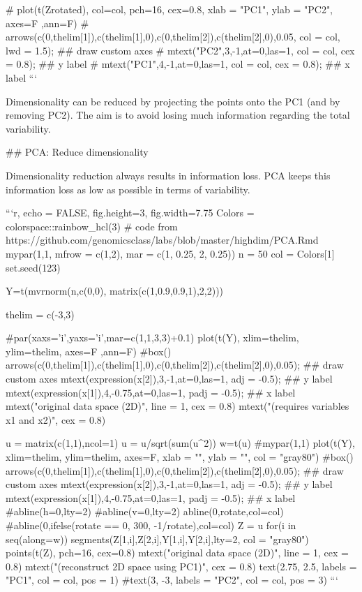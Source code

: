 {{{{# plot(t(Zrotated), col=col, pch=16, cex=0.8, xlab = "PC1", ylab = "PC2", axes=F ,ann=F)
# arrows(c(0,thelim[1]),c(thelim[1],0),c(0,thelim[2]),c(thelim[2],0),0.05, col = col, lwd = 1.5); ## draw custom axes
# mtext("PC2",3,-1,at=0,las=1, col = col, cex = 0.8); ## y label
# mtext("PC1",4,-1,at=0,las=1, col = col, cex = 0.8); ## x label
```

Dimensionality can be reduced by projecting the points onto the PC1 (and by removing PC2). The aim is to avoid losing much information regarding the total variability.

## PCA: Reduce dimensionality

Dimensionality reduction always results in information loss. PCA keeps this information loss as low as possible in terms of variability.

```{r, echo = FALSE, fig.height=3, fig.width=7.75}
Colors = colorspace::rainbow_hcl(3)
# code from https://github.com/genomicsclass/labs/blob/master/highdim/PCA.Rmd
mypar(1,1, mfrow = c(1,2), mar = c(1, 0.25, 2, 0.25))
n = 50
col = Colors[1]
set.seed(123)

Y=t(mvrnorm(n,c(0,0), matrix(c(1,0.9,0.9,1),2,2)))

thelim = c(-3,3)

#par(xaxs='i',yaxs='i',mar=c(1,1,3,3)+0.1)
plot(t(Y), xlim=thelim, ylim=thelim, axes=F ,ann=F)
#box()
arrows(c(0,thelim[1]),c(thelim[1],0),c(0,thelim[2]),c(thelim[2],0),0.05); ## draw custom axes
mtext(expression(x[2]),3,-1,at=0,las=1, adj = -0.5); ## y label
mtext(expression(x[1]),4,-0.75,at=0,las=1, padj = -0.5); ## x label
mtext("original data space (2D)", line = 1, cex = 0.8)
mtext("(requires variables x1 and x2)", cex = 0.8)

u = matrix(c(1,1),ncol=1)
u = u/sqrt(sum(u^2))
w=t(u)%
#mypar(1,1)
plot(t(Y), xlim=thelim, ylim=thelim, axes=F, xlab = "", ylab = "", col = "gray80")
#box()
arrows(c(0,thelim[1]),c(thelim[1],0),c(0,thelim[2]),c(thelim[2],0),0.05); ## draw custom axes
mtext(expression(x[2]),3,-1,at=0,las=1, adj = -0.5); ## y label
mtext(expression(x[1]),4,-0.75,at=0,las=1, padj = -0.5); ## x label
#abline(h=0,lty=2)
#abline(v=0,lty=2)
abline(0,rotate,col=col)
#abline(0,ifelse(rotate == 0, 300, -1/rotate),col=col)
Z = u%
for(i in seq(along=w))
  segments(Z[1,i],Z[2,i],Y[1,i],Y[2,i],lty=2, col = "gray80")
points(t(Z), pch=16, cex=0.8)
mtext("original data space (2D)", line = 1, cex = 0.8)
mtext("(reconstruct 2D space using PC1)", cex = 0.8)
text(2.75, 2.5, labels = "PC1", col = col, pos = 1)
#text(3, -3, labels = "PC2", col = col, pos = 3)
```

}}}}
